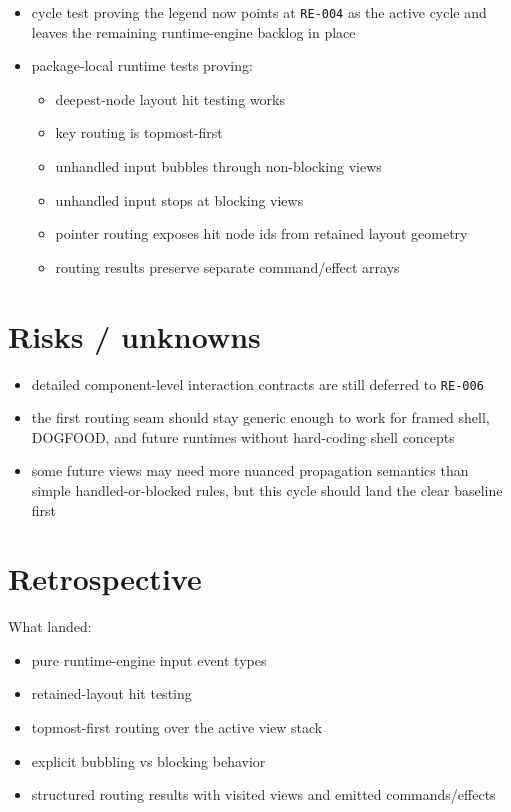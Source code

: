 \begin{itemize}
\tightlist
\item
  cycle test proving the legend now points at \texttt{R\allowbreak{}E\allowbreak{}-\allowbreak{}0\allowbreak{}0\allowbreak{}4} as the active cycle and leaves the remaining runtime-engine backlog in place
\item
  package-local runtime tests proving:

  \begin{itemize}
  \tightlist
  \item
    deepest-node layout hit testing works
  \item
    key routing is topmost-first
  \item
    unhandled input bubbles through non-blocking views
  \item
    unhandled input stops at blocking views
  \item
    pointer routing exposes hit node ids from retained layout geometry
  \item
    routing results preserve separate command/effect arrays
  \end{itemize}
\end{itemize}

\section{Risks / unknowns}\label{record-152-risks-unknowns}

\begin{itemize}
\tightlist
\item
  detailed component-level interaction contracts are still deferred to \texttt{R\allowbreak{}E\allowbreak{}-\allowbreak{}0\allowbreak{}0\allowbreak{}6}
\item
  the first routing seam should stay generic enough to work for framed shell, DOGFOOD, and future runtimes without hard-coding shell concepts
\item
  some future views may need more nuanced propagation semantics than simple handled-or-blocked rules, but this cycle should land the clear baseline first
\end{itemize}

\section{Retrospective}\label{record-152-retrospective}

What landed:

\begin{itemize}
\tightlist
\item
  pure runtime-engine input event types
\item
  retained-layout hit testing
\item
  topmost-first routing over the active view stack
\item
  explicit bubbling vs blocking behavior
\item
  structured routing results with visited views and emitted commands/effects
\end{itemize}

